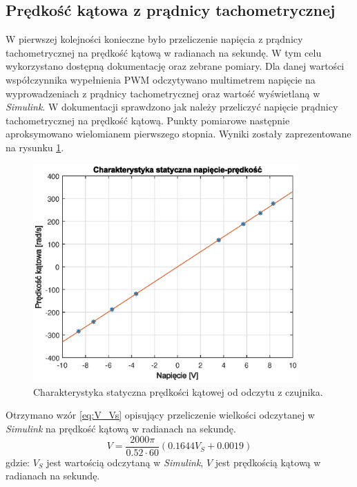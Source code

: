 \documentclass[11pt,a4paper]{article}
\begin{document}
\subsection{Prędkość kątowa z prądnicy tachometrycznej}
W pierwszej kolejności konieczne było przeliczenie napięcia z prądnicy tachometrycznej na prędkość kątową w radianach na sekundę. W tym celu wykorzystano dostępną dokumentację oraz zebrane pomiary. Dla danej wartości współczynnika wypełnienia PWM odczytywano multimetrem napięcie na wyprowadzeniach z prądnicy tachometrycznej oraz wartość wyświetlaną w \textit{Simulink}. W dokumentacji sprawdzono jak należy przeliczyć napięcie prądnicy tachometrycznej na prędkość kątową. Punkty pomiarowe następnie aproksymowano wielomianem pierwszego stopnia. Wyniki zostały zaprezentowane na rysunku \ref{fig:char_V_U}.

\begin{figure}[H]
	\centering
	\includegraphics[width=4in]{Figures/char_V_U.eps}
	\caption{Charakterystyka statyczna prędkości kątowej od odczytu z czujnika.}
	\label{fig:char_V_U}
\end{figure}

Otrzymano wzór \eqref{eq:V_Vs} opisujący przeliczenie wielkości odczytanej w \textit{Simulink} na prędkość kątową w radianach na sekundę.
\begin{equation}
V = \frac{2000\pi}{0.52\cdot 60}(0.1644V_S+0.0019)
\label{eq:V_Vs}
\end{equation}
\noindent gdzie:\newline
\(V_S\) jest wartością odczytaną w \textit{Simulink},\newline
\(V\) jest prędkością kątową w radianach na sekundę.
\end{document}
